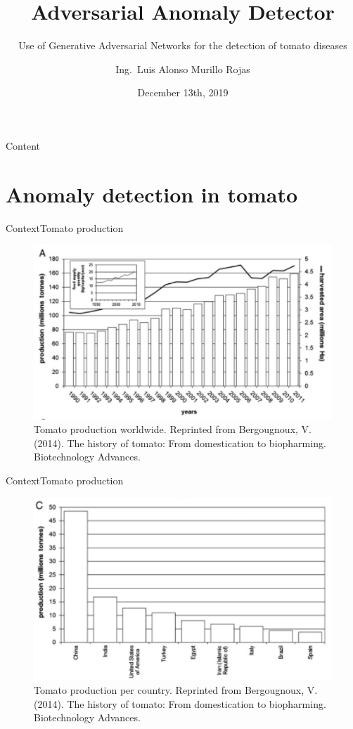 \documentclass[15pt]{beamer} %
\title[Adversarial Anomaly detector]{Adversarial Anomaly Detector}
\subtitle{Use of Generative Adversarial Networks for the detection of tomato diseases}
\institute[TEC]{Escuela de Ingeniería Electrónica \\ Tecnológico de Costa Rica}
\date[Mayo 2015]{December 13th, 2019}
\author[L.\ Murillo]{Ing.\ Luis Alonso Murillo Rojas}
\begin{document}
\graphicspath{{./}{./fig/}}

\begin{frame}
  \titlepage
\end{frame}


\begin{frame}{Content}
  \tableofcontents
\end{frame}

\section{Anomaly detection in tomato}

\begin{frame}{Context}{\tiny{Tomato production}}
\begin{figure}
 \centering
 \includegraphics[width=.7\textwidth]{tomato_metrics_per_year}
 \tiny{\caption{Tomato production worldwide. Reprinted from Bergougnoux, V. (2014). The history of tomato: From domestication to biopharming. Biotechnology Advances.}}
\end{figure}
\end{frame} 

\begin{frame}{Context}{\tiny{Tomato production}}
 \begin{figure}
 \centering
 \includegraphics[width=.7\textwidth]{tomato_metrics_per_country}
 \tiny{\caption{Tomato production per country. Reprinted from Bergougnoux, V. (2014). The history of tomato: From domestication to biopharming. Biotechnology Advances.}}
\end{figure}
\end{frame}
\end{document}
